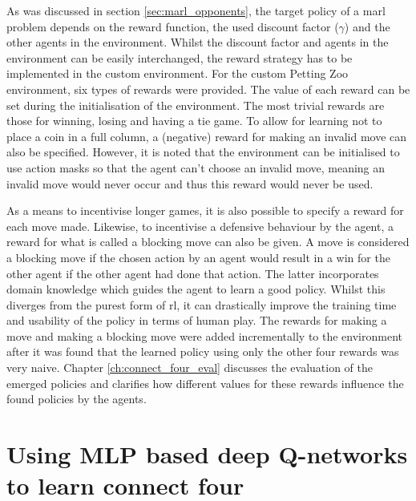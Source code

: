 As was discussed in section \ref{sec:marl_opponents}, the target policy of a \gls{marl} problem depends on the reward function, the used discount factor ($\gamma$) and the other agents in the environment.
Whilst the discount factor and agents in the environment can be easily interchanged, the reward strategy has to be implemented in the custom environment.
For the custom Petting Zoo environment, six types of rewards were provided.
The value of each reward can be set during the initialisation of the environment.
The most trivial rewards are those for winning, losing and having a tie game.
To allow for learning not to place a coin in a full column, a (negative) reward for making an invalid move can also be specified.
However, it is noted that the environment can be initialised to use action masks so that the agent can't choose an invalid move, meaning an invalid move would never occur and thus this reward would never be used.

As a means to incentivise longer games, it is also possible to specify a reward for each move made.
Likewise, to incentivise a defensive behaviour by the agent, a reward for what is called a blocking move can also be given.
A move is considered a blocking move if the chosen action by an agent would result in a win for the other agent if the other agent had done that action.
The latter incorporates domain knowledge which guides the agent to learn a good policy.
Whilst this diverges from the purest form of \gls{rl}, it can drastically improve the training time and usability of the policy in terms of human play.
The rewards for making a move and making a blocking move were added incrementally to the environment after it was found that the learned policy using only the other four rewards was very naive.
Chapter \ref{ch:connect_four_eval} discusses the evaluation of the emerged policies and clarifies how different values for these rewards influence the found policies by the agents.



\section{Using MLP based deep Q-networks to learn connect four}
\label{sec:connect_four_rl-mlp-dqn}

